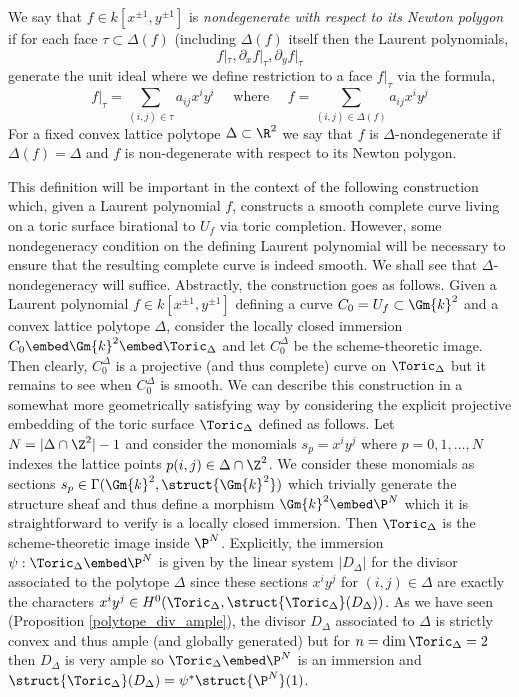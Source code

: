 \documentclass[12pt]{article}
\begin{document}
\begin{defn}
We say that $f \in k[x^{\pm 1}, y^{\pm 1}]$ is \textit{nondegenerate with respect to its Newton polygon} if for each face $\tau \subset \Delta(f)$ (including $\Delta(f)$ itself then the Laurent polynomials,
\[ f|_\tau, \partial_x f|_\tau, \partial_y f|_\tau \]
generate the unit ideal where we define restriction to a face $f|_\tau$ via the formula,
\[ f |_{\tau} = \sum_{(i, j) \in \tau} a_{ij} x^i y^i \quad \text{ where } \quad f = \sum_{(i,j) \in \Delta(f)} a_{ij} x^i y^j \]
For a fixed convex lattice polytope $\Delta \subset \R^2$ we say that $f$ is $\Delta$-nondegenerate if $\Delta(f) = \Delta$ and $f$ is non-degenerate with respect to its Newton polygon. 
\end{defn}
\noindent
This definition will be important in the context of the following construction which, given a Laurent polynomial $f$, constructs a smooth complete curve living on a toric surface birational  to $U_f$ via toric completion. However, some nondegeneracy condition on the defining Laurent polynomial will be necessary to ensure that the resulting complete curve is indeed smooth. We shall see that $\Delta$-nondegeneracy will suffice. Abstractly, the construction goes as follows. Given a Laurent polynomial $f \in k[x^{\pm 1}, y^{\pm 1}]$ defining a curve $C_0 = U_f \subset \Gm{k}^2$ and a convex lattice polytope $\Delta$, consider the locally closed immersion $C_0 \embed \Gm{k}^2 \embed \Toric_\Delta$ and let $C_0^\Delta$ be the scheme-theoretic image. Then clearly, $C_0^\Delta$ is a projective (and thus complete) curve on $\Toric_\Delta$ but it remains to see when $C_0^\Delta$ is smooth. We can describe this construction in a somewhat more geometrically satisfying way by considering the explicit projective embedding of the toric surface $\Toric_\Delta$ defined as follows. Let $N = | \Delta \cap \Z^2| - 1$ and consider the monomials $s_p = x^i y^j$ where $p = 0, 1, \dots, N$ indexes the lattice points $p(i, j) \in \Delta \cap \Z^2$. We consider these monomials as sections $s_p \in \Gamma(\Gm{k}^2, \struct{\Gm{k}^2})$ which trivially generate the structure sheaf and thus define a morphism $\Gm{k}^2 \embed \P^N$ which it is straightforward to verify is a locally closed immersion. Then $\Toric_\Delta$ is the scheme-theoretic image inside $\P^N$. Explicitly, the immersion $\psi : \Toric_\Delta \embed \P^N$ is given by the linear system $|D_\Delta|$ for the divisor associated to the polytope $\Delta$ since these sections $x^i y^j$ for $(i, j) \in \Delta$ are exactly the characters $x^i y^j \in H^0(\Toric_\Delta, \struct{\Toric_\Delta}(D_\Delta))$. As we have seen (Proposition \ref{polytope_div_ample}), the divisor $D_\Delta$ associated to $\Delta$ is strictly convex and thus ample (and globally generated) but for $n = \dim{\Toric_\Delta} = 2$ then $D_\Delta$ is very ample so $\Toric_\Delta \embed \P^N$ is an immersion and $\struct{\Toric_\Delta}(D_\Delta) = \psi^* \struct{\P^N}(1)$. 
\end{document}
